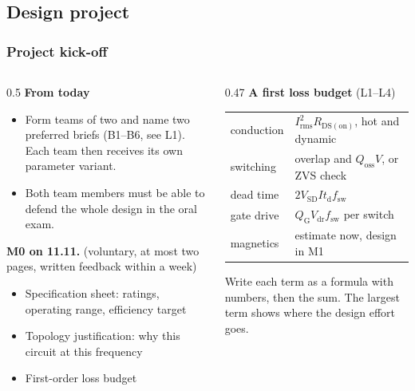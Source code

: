 \subsection{Design project}

\begin{frame}
	\frametitle{Project kick-off}
	\begin{columns}[T]
		\begin{column}{0.5\textwidth}
			\small
			\textbf{From today}
			\begin{itemize}
				\item Form teams of two and name two preferred briefs (B1--B6, see L1). Each team then receives its own parameter variant.
				\item Both team members must be able to defend the whole design in the oral exam.
			\end{itemize}
			\textbf{M0 on 11.11.} (voluntary, at most two pages, written feedback within a week)
			\begin{itemize}
				\item Specification sheet: ratings, operating range, efficiency target
				\item Topology justification: why this circuit at this frequency
				\item First-order loss budget
			\end{itemize}
		\end{column}
		\begin{column}{0.47\textwidth}
			\small
			\textbf{A first loss budget} (L1--L4)
			\begin{table}
				\centering
				\footnotesize
				\begin{tabular}{|l|l|}
					\hline
					conduction & $I_\mathrm{rms}^2R_\mathrm{DS(on)}$, hot and dynamic \\
					switching  & overlap and $Q_\mathrm{oss}V$, or ZVS check          \\
					dead time  & $2V_\mathrm{SD}It_\mathrm{d}f_\mathrm{sw}$            \\
					gate drive & $Q_\mathrm{G}V_\mathrm{dr}f_\mathrm{sw}$ per switch   \\
					magnetics  & estimate now, design in M1                            \\
					\hline
				\end{tabular}
			\end{table}
			Write each term as a formula with numbers, then the sum. The largest term shows where the design effort goes.
		\end{column}
	\end{columns}
\end{frame}

